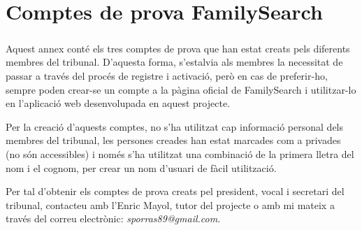 \chapter{Comptes de prova FamilySearch}

\paragraph{}
Aquest annex conté els tres comptes de prova que han estat creats pels diferents membres del tribunal. D’aquesta forma, s’estalvia als membres la necessitat de passar a través del procés de registre i activació, però en cas de preferir-ho, sempre poden crear-se un compte a la pàgina oficial de FamilySearch i utilitzar-lo en l’aplicació web desenvolupada en aquest projecte.

Per la creació d’aquests comptes, no s’ha utilitzat cap informació personal dels membres del tribunal, les persones creades han estat marcades com a privades (no són accessibles) i només s’ha utilitzat una combinació de la primera lletra del nom i el cognom, per crear un nom d’usuari de fàcil utilització.

Per tal d'obtenir els comptes de prova creats pel president, vocal i secretari del tribunal, contacteu amb l'Enric Mayol, tutor del projecte o amb mi mateix a través del correu electrònic: \emph{sporras89@gmail.com}.
